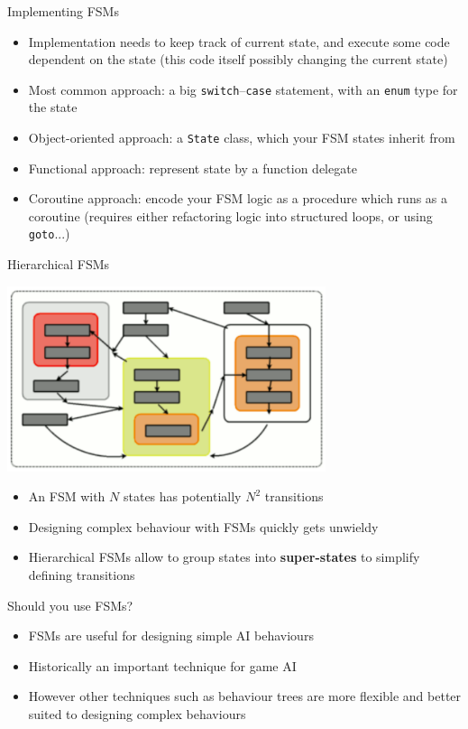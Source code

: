 \begin{frame}[fragile]{Implementing FSMs}
    \begin{itemize}
        \pause\item Implementation needs to keep track of current state,
            and execute some code dependent on the state
            (this code itself possibly changing the current state)
        \pause\item Most common approach: a big \lstinline{switch}--\lstinline{case} statement,
            with an \lstinline{enum} type for the state
        \pause\item Object-oriented approach: a \lstinline{State} class, which your FSM states inherit from
        \pause\item Functional approach: represent state by a function delegate
        \pause\item Coroutine approach: encode your FSM logic as a procedure which runs as a coroutine
            (requires either refactoring logic into structured loops, or using \lstinline{goto}...)
    \end{itemize}
\end{frame}

\begin{frame}{Hierarchical FSMs}
    \begin{center}
        \includegraphics[width=0.7\textwidth]{hierarchical_fsm}
    \end{center}
    \begin{itemize}
        \pause\item An FSM with $N$ states has potentially $N^2$ transitions
        \pause\item Designing complex behaviour with FSMs quickly gets unwieldy
        \pause\item Hierarchical FSMs allow to group states into \textbf{super-states} to simplify defining transitions
    \end{itemize}
\end{frame}

\begin{frame}{Should you use FSMs?}
    \begin{itemize}
        \pause\item FSMs are useful for designing simple AI behaviours
        \pause\item Historically an important technique for game AI
        \pause\item However other techniques such as behaviour trees are more flexible
            and better suited to designing complex behaviours
    \end{itemize}
\end{frame}

